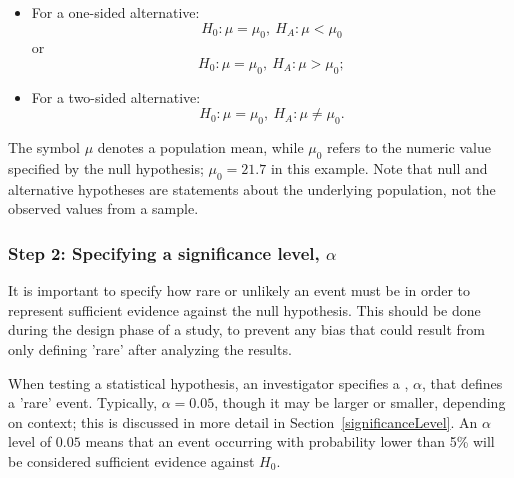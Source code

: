 \begin{spacing}{1.5}
\begin{itemize}
	\item For a one-sided alternative: \[H_0: \mu = \mu_0, \ H_A: \mu < \mu_0\] or \[H_0: \mu = \mu_0, \  H_A: \mu > \mu_0;\]
	
	\item For a two-sided alternative: \[H_0: \mu = \mu_0, \ H_A: \mu \neq \mu_0.\]
\end{itemize}

The symbol $\mu$ denotes a population mean, while $\mu_0$ refers to the numeric value specified by the null hypothesis; $\mu_0 = 21.7$ in this example. Note that null and alternative hypotheses are statements about the underlying population, not the observed values from a sample. 

\subsubsection{Step 2: Specifying a significance level, $\alpha$}

It is important to specify how rare or unlikely an event must be in order to represent sufficient evidence against the null hypothesis. This should be done during the design phase of a study, to prevent any bias that could result from only defining 'rare' after analyzing the results. 

When testing a statistical hypothesis, an investigator specifies a , $\alpha$, that defines a 'rare' event. Typically, $\alpha = 0.05$, though it may be larger or smaller, depending on context; this is discussed in more detail in Section~\ref{significanceLevel}. An $\alpha$ level of $0.05$ means that an event occurring with probability lower than 5\% will be considered sufficient evidence against $H_0$.

\end{spacing}
